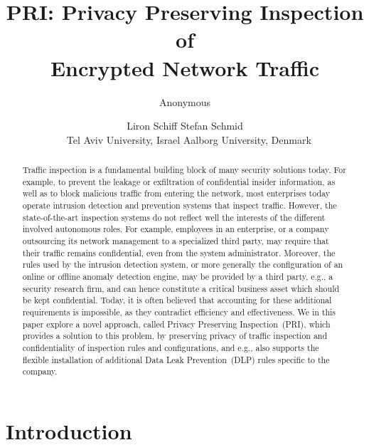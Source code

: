 \documentclass{sig-alternate-10pt}
\newcommand{\sys}{PRI\xspace}
\begin{document}
\title{\sys: Privacy Preserving Inspection of\\Encrypted Network Traffic}



\author{Anonymous}

\author{
Liron Schiff \quad Stefan Schmid\\
{\small~ Tel Aviv University, Israel \quad  Aalborg University, Denmark}
}


\date{}

\maketitle \thispagestyle{empty}

\sloppy

\begin{abstract}
Traffic inspection is a fundamental building block of many 
security solutions today. For example,  
to prevent the leakage or exfiltration of confidential insider information,
as well as to block malicious traffic from entering the network,
most enterprises today operate intrusion detection and 
prevention systems that inspect traffic. 
However, the state-of-the-art inspection systems 
do not reflect well the interests of the different
involved autonomous roles.
For example, employees in an enterprise, or a company
outsourcing its network management to a specialized third party,
may require that
their traffic remains confidential, even from the 
system administrator. 
Moreover, the rules used by the intrusion detection
system, or more generally the configuration of an 
online or offline anomaly detection engine,
may
be provided by a third party, e.g.,
a security research firm, and can hence constitute
a critical business asset which should 
be kept confidential.
Today, it is often believed that 
accounting for these additional
requirements is impossible, as they 
contradict efficiency and effectiveness. 
We in this paper explore a novel approach,
called
Privacy Preserving Inspection~(\sys),
which provides a solution to this problem,
by preserving  
privacy of traffic inspection
and confidentiality of inspection rules and configurations,
and e.g., also supports the flexible installation of 
additional Data Leak Prevention~(DLP) rules 
specific to the company.
\end{abstract}


\section{Introduction}\label{sec:intro}
\end{document}
